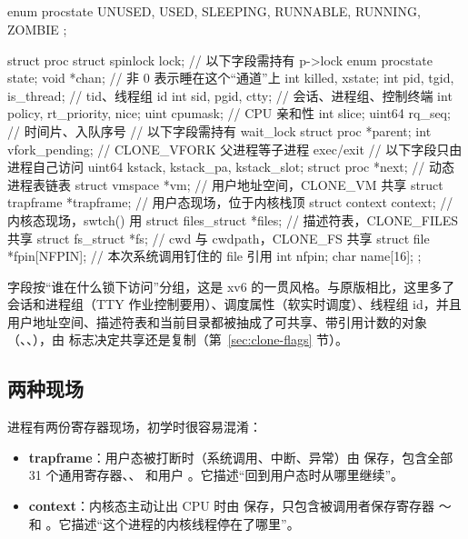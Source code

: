 \subsection{}

\begin{ccode}
enum procstate { UNUSED, USED, SLEEPING, RUNNABLE, RUNNING, ZOMBIE };

struct proc {
  struct spinlock lock;
  // 以下字段需持有 p->lock
  enum procstate state;
  void *chan;                  // 非 0 表示睡在这个“通道”上
  int killed, xstate;
  int pid, tgid, is_thread;    // tid、线程组 id
  int sid, pgid, ctty;         // 会话、进程组、控制终端
  int policy, rt_priority, nice;
  uint cpumask;                // CPU 亲和性
  int slice; uint64 rq_seq;    // 时间片、入队序号
  // 以下字段需持有 wait_lock
  struct proc *parent;
  int vfork_pending;           // CLONE_VFORK 父进程等子进程 exec/exit
  // 以下字段只由进程自己访问
  uint64 kstack, kstack_pa, kstack_slot;
  struct proc *next;           // 动态进程表链表
  struct vmspace *vm;          // 用户地址空间，CLONE_VM 共享
  struct trapframe *trapframe; // 用户态现场，位于内核栈顶
  struct context context;      // 内核态现场，swtch() 用
  struct files_struct *files;  // 描述符表，CLONE_FILES 共享
  struct fs_struct *fs;        // cwd 与 cwdpath，CLONE_FS 共享
  struct file *fpin[NFPIN];    // 本次系统调用钉住的 file 引用
  int nfpin;
  char name[16];
};
\end{ccode}

字段按“谁在什么锁下访问”分组，这是 xv6 的一贯风格。与原版相比，这里多了会话和进程组（TTY 作业控制要用）、调度属性（软实时调度）、线程组 id，并且用户地址空间、描述符表和当前目录都被抽成了可共享、带引用计数的对象（、、），由  标志决定共享还是复制（第~\ref{sec:clone-flags} 节）。

\subsection{两种现场}

进程有两份寄存器现场，初学时很容易混淆：

\begin{itemize}
  \item \textbf{trapframe}：用户态被打断时（系统调用、中断、异常）由  保存，包含全部 31 个通用寄存器、、 和用户 。它描述“回到用户态时从哪里继续”。
  \item \textbf{context}：内核态主动让出 CPU 时由  保存，只包含被调用者保存寄存器 ～ 和 。它描述“这个进程的内核线程停在了哪里”。
\end{itemize}

